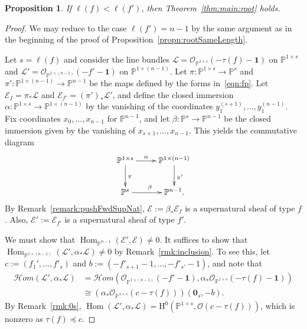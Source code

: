 \documentclass[12pt]{amsart}
\newtheorem{prop}[equation]{Proposition}
\theoremstyle{definition}
\newcommand{\Hom}{\operatorname{Hom}}
\newcommand{\sheafHom}{\mathcal{H}om}
\newcommand{\Hs}{\mathrm{H}}
\newcommand{\EE}{\mathcal{E}}
\newcommand{\cO}{{\mathcal O}}
\newcommand{\PP}{\mathbb{P}}
\begin{document}
\begin{prop}
\label{propn:rootDiffLength}
If $\ell(f) < \ell(f')$, then Theorem~\ref{thm:main:root} holds.
\end{prop}

\begin{proof}
We may reduce to the case $\ell(f')=n-1$ by the same argument as in the beginning of the proof of Proposition~\ref{propn:rootSameLength}.

Let $s = \ell(f)$ and consider the line bundles 
$\mathcal L = \cO_{\PP^{1 \times s}}(-\tau(f) - \mathbf 1)$ 
on $\PP^{1 \times s}$ and 
$\mathcal L' = \cO_{\PP^{1 \times(n-1)}}(-f' - \mathbf 1)$ 
on $\PP^{1 \times (n-1)}$. 
Let $\pi\colon\PP^{1\times s} \to \PP^s$ and 
$\pi'\colon \PP^{1 \times (n-1)} \to \PP^{n-1}$ be the maps 
defined by the forms in~\eqref{eqn:fp}. 
Let $\EE_f = \pi_* \mathcal L$ and 
$\EE_{f'} = (\pi')_* \mathcal L'$, and define the closed immersion 
$\alpha\colon\PP^{1\times s}\rightarrow \PP^{1\times(n-1)}$ 
by the vanishing of the coordinates $y_1^{(s+1)}, \ldots,y_1^{(n-1)}$. 
Fix coordinates $x_0, \ldots, x_{n-1}$ for $\PP^{n-1}$, and
let $\beta\colon \PP^s \rightarrow \PP^{n-1}$ be the closed immersion 
given by the vanishing of $x_{s+1}, \ldots, x_{n-1}$. 
This yields the commutative diagram
\[
\xymatrix{
\PP^{1\times s} \ar[r]^-{\alpha} \ar[d]^{\pi} & 
\PP^{1 \times (n-1)} \ar[d]^{\pi'} \\
\PP^s \ar[r]^{\beta} & \PP^{n-1}.
}
\]
By Remark~\ref{remark:pushFwdSupNat}, 
$\EE := \beta_* \EE_f$ is a supernatural sheaf of type $f$. 
Also, $\EE' := \EE_{f'}$ is a supernatural sheaf of type $f'$. 

We must show that $\Hom_{\PP^{n-1}}(\EE', \EE) \neq 0$. 
It suffices to show that 
$\Hom_{\PP^{1 \times
(n-1)}}(\mathcal L', \alpha_*\mathcal L) \neq 0$ 
by Remark~\ref{rmk:inclusion}. 
To see this, let $c:=(f_1', \dots, f'_s)$ and $b:=(-f'_{s+1}-1, \dots, -f'_{s'}-1)$, 
and note that 
\begin{align*}
\sheafHom (\mathcal L', \alpha_*\mathcal L) & = 
\sheafHom(\cO_{\PP^{1\times (n-1)}}(-f'-\mathbf 1), 
\alpha_* \cO_{\PP^{1\times s}}(-\tau(f)-\mathbf 1)) \\ 
& \cong (\alpha_* \cO_{\PP^{1\times s}}(c-\tau(f)))(\mathbf 0_s, -b).
\end{align*}
By Remark~\ref{rmk:0s}, 
$\Hom (\mathcal L', \alpha_*\mathcal L) = \Hs^0(\PP^{1 \times s},
\cO(c-\tau(f)))$, which is nonzero as $\tau(f) \preceq c$.
\end{proof}

\end{document}
